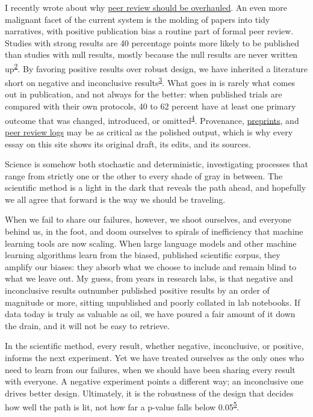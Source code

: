 \documentclass[12pt]{article}
\begin{document}
I recently wrote about why \href{/essays/peer-review-scaled-and-continuous/}{peer review should be overhauled}. An even more malignant facet of the current system is the molding of papers into tidy narratives, with positive publication bias a routine part of formal peer review. Studies with strong results are 40 percentage points more likely to be published than studies with null results, mostly because the null results are never written up\textsuperscript{\hyperlink{ref-franco2014}{2}}. By favoring positive results over robust design, we have inherited a literature short on negative and inconclusive results\textsuperscript{\hyperlink{ref-dwan2008}{3}}. What goes in is rarely what comes out in publication, and not always for the better: when published trials are compared with their own protocols, 40 to 62 percent have at least one primary outcome that was changed, introduced, or omitted\textsuperscript{\hyperlink{ref-dwan2013}{4}}. Provenance, \href{https://www.biorxiv.org/}{preprints}, and \href{https://elifesciences.org/about/peer-review}{peer review logs} may be as critical as the polished output, which is why every essay on this site shows its original draft, its edits, and its sources.

Science is somehow both stochastic and deterministic, investigating processes that range from strictly one or the other to every shade of gray in between. The scientific method is a light in the dark that reveals the path ahead, and hopefully we all agree that forward is the way we should be traveling.

When we fail to share our failures, however, we shoot ourselves, and everyone behind us, in the foot, and doom ourselves to spirals of inefficiency that machine learning tools are now scaling. When large language models and other machine learning algorithms learn from the biased, published scientific corpus, they amplify our biases: they absorb what we choose to include and remain blind to what we leave out. My guess, from years in research labs, is that negative and inconclusive results outnumber published positive results by an order of magnitude or more, sitting unpublished and poorly collated in lab notebooks. If data today is truly as valuable as oil, we have poured a fair amount of it down the drain, and it will not be easy to retrieve.

In the scientific method, every result, whether negative, inconclusive, or positive, informs the next experiment. Yet we have treated ourselves as the only ones who need to learn from our failures, when we should have been sharing every result with everyone. A negative experiment points a different way; an inconclusive one drives better design. Ultimately, it is the robustness of the design that decides how well the path is lit, not how far a p-value falls below 0.05\textsuperscript{\hyperlink{ref-asa2016}{5}}.
\end{document}
